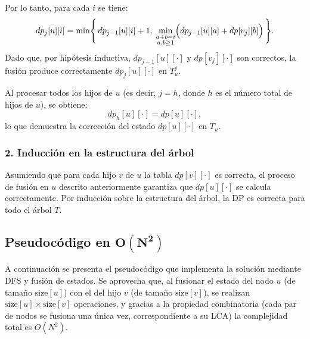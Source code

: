 \documentclass[a4paper, 12pt]{article}
\begin{document}
Por lo tanto, para cada \(i\) se tiene:
\[
dp_j[u][i] = \min \Biggl\{\, dp_{j-1}[u][i] + 1,\; \min_{\substack{a+b=i \\ a,b\ge1}} \Bigl( dp_{j-1}[u][a] + dp[v_j][b] \Bigr) \,\Biggr\}.
\]
Dado que, por hipótesis inductiva, \(dp_{j-1}[u][\cdot]\) y \(dp[v_j][\cdot]\) son correctos, la fusión produce correctamente \(dp_j[u][\cdot]\) en \(T_u^j\).

Al procesar todos los hijos de \(u\) (es decir, \(j=h\), donde \(h\) es el número total de hijos de \(u\)), se obtiene:
\[
dp_h[u][\cdot] = dp[u][\cdot],
\]
lo que demuestra la corrección del estado \(dp[u][\cdot]\) en \(T_u\).

\subsubsection*{2. Inducción en la estructura del árbol}

Asumiendo que para cada hijo \(v\) de \(u\) la tabla \(dp[v][\cdot]\) es correcta, el proceso de fusión en \(u\) descrito anteriormente garantiza que \(dp[u][\cdot]\) se calcula correctamente. Por inducción sobre la estructura del árbol, la DP es correcta para todo el árbol \(T\).

\bigskip

\subsection{Pseudocódigo en \(\boldsymbol{O(N^2)}\)}

A continuación se presenta el pseudocódigo que implementa la solución mediante DFS y fusión de estados. Se aprovecha que, al fusionar el estado del nodo \(u\) (de tamaño \(\text{size}[u]\)) con el del hijo \(v\) (de tamaño \(\text{size}[v]\)), se realizan \(\text{size}[u] \times \text{size}[v]\) operaciones, y gracias a la propiedad combinatoria (cada par de nodos se fusiona una única vez, correspondiente a su LCA) la complejidad total es \(O(N^2)\).
\end{document}
